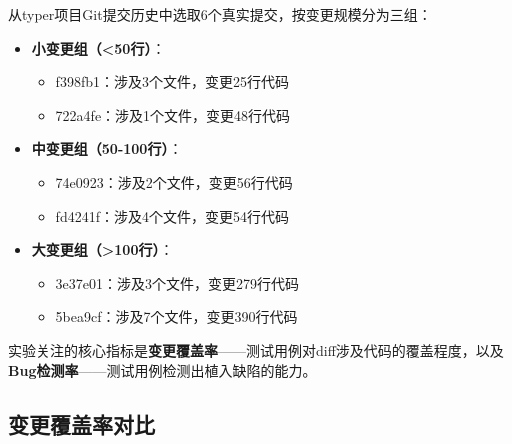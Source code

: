 从typer项目Git提交历史中选取6个真实提交，按变更规模分为三组：

\begin{itemize}
    \item \textbf{小变更组（<50行）}：
    \begin{itemize}
        \item f398fb1：涉及3个文件，变更25行代码
        \item 722a4fe：涉及1个文件，变更48行代码
    \end{itemize}
    \item \textbf{中变更组（50-100行）}：
    \begin{itemize}
        \item 74e0923：涉及2个文件，变更56行代码
        \item fd4241f：涉及4个文件，变更54行代码
    \end{itemize}
    \item \textbf{大变更组（>100行）}：
    \begin{itemize}
        \item 3e37e01：涉及3个文件，变更279行代码
        \item 5bea9cf：涉及7个文件，变更390行代码
    \end{itemize}
\end{itemize}

实验关注的核心指标是\textbf{变更覆盖率}——测试用例对diff涉及代码的覆盖程度，以及\textbf{Bug检测率}——测试用例检测出植入缺陷的能力。

\subsection{变更覆盖率对比}
\label{ssec:expB_change_coverage}

